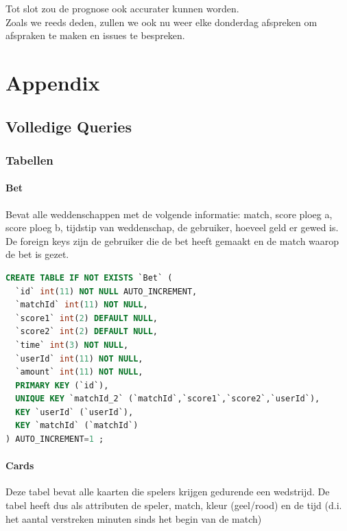 \documentclass[11pt]{article}
\begin{document}
Tot slot zou de prognose ook accurater kunnen worden.\\

Zoals we reeds deden, zullen we ook nu weer elke donderdag afspreken om afspraken te maken en issues te bespreken.



\section{Appendix}

\subsection{Volledige Queries}


\subsubsection{Tabellen}




    \paragraph{Bet}
        Bevat alle weddenschappen met de volgende informatie:
            match, score ploeg a, score ploeg b, tijdstip van weddenschap, de gebruiker,
            hoeveel geld er gewed is.
        De foreign keys zijn de gebruiker die de bet heeft gemaakt en de match waarop 
        de bet is gezet.
        
        \begin{framed}
        \begin{lstlisting}[language=sql]
CREATE TABLE IF NOT EXISTS `Bet` (
  `id` int(11) NOT NULL AUTO_INCREMENT,
  `matchId` int(11) NOT NULL,
  `score1` int(2) DEFAULT NULL,
  `score2` int(2) DEFAULT NULL,
  `time` int(3) NOT NULL,
  `userId` int(11) NOT NULL,
  `amount` int(11) NOT NULL,
  PRIMARY KEY (`id`),
  UNIQUE KEY `matchId_2` (`matchId`,`score1`,`score2`,`userId`),
  KEY `userId` (`userId`),
  KEY `matchId` (`matchId`)
) AUTO_INCREMENT=1 ;
        \end{lstlisting}
        \end{framed}

    \paragraph{Cards}
    
        Deze tabel bevat alle kaarten die spelers krijgen gedurende een wedstrijd.
        De tabel heeft dus als attributen de speler, match, kleur (geel/rood) en de tijd (d.i. het aantal verstreken minuten sinds het begin van de match)
    
\end{document}

